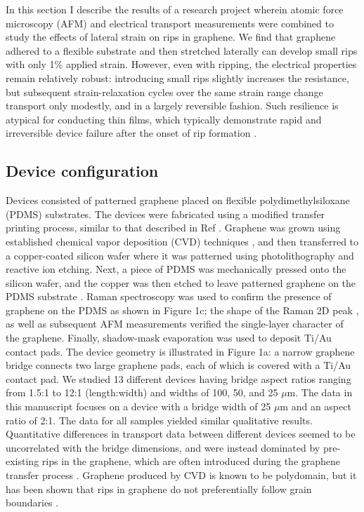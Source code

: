 \documentclass[edeposit,fullpage,draftthesis]{uiucthesis2009}
\begin{document}
In this section I describe the results of a research project wherein atomic force microscopy (AFM) and electrical transport measurements were combined to study the effects of lateral strain on rips in graphene. We find that graphene adhered to a flexible substrate and then stretched laterally can develop small rips with only 1\% applied strain. However, even with ripping, the electrical properties remain relatively robust: introducing small rips slightly increases the resistance, but subsequent strain-relaxation cycles over the same strain range change transport only modestly, and in a largely reversible fashion. Such resilience is atypical for conducting thin films, which typically demonstrate rapid and irreversible device failure after the onset of rip formation \cite{Cairns2000,Fortunato2002}.

    \subsection{Device configuration}
    
    Devices consisted of patterned graphene placed on flexible polydimethylsiloxane (PDMS) substrates. The devices were fabricated using a modified transfer printing process, similar to that described in Ref \cite{Kim2009}. Graphene was grown using established chemical vapor deposition (CVD) techniques \cite{Li2009}, and then transferred to a copper-coated silicon wafer where it was patterned using photolithography and reactive ion etching. Next, a piece of PDMS was mechanically pressed onto the silicon wafer, and the copper was then etched to leave patterned graphene on the PDMS substrate \cite{Lee2010}. Raman spectroscopy was used to confirm the presence of graphene on the PDMS as shown in Figure 1c; the shape of the Raman 2D peak \cite{Ferrari2006}, as well as subsequent AFM measurements verified the single-layer character of the graphene. Finally, shadow-mask evaporation was used to deposit Ti/Au contact pads. The device geometry is illustrated in Figure 1a: a narrow graphene bridge connects two large graphene pads, each of which is covered with a Ti/Au contact pad. We studied 13 different devices having bridge aspect ratios ranging from 1.5:1 to 12:1 (length:width) and widths of 100, 50, and 25 $\mu$m. The data in this manuscript focuses on a device with a bridge width of 25 $\mu$m and an aspect ratio of 2:1. The data for all samples yielded similar qualitative results. Quantitative differences in transport data between different devices seemed to be uncorrelated with the bridge dimensions, and were instead dominated by pre-existing rips in the graphene, which are often introduced during the graphene transfer process \cite{Kim2012}. Graphene produced by CVD is known to be polydomain, but it has been shown that rips in graphene do not preferentially follow grain boundaries \cite{Kim2012}.
    
\end{document}

